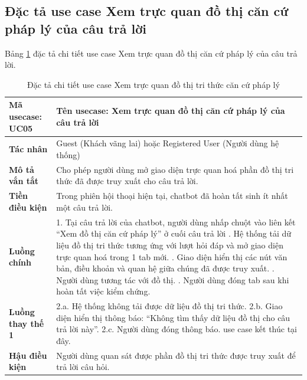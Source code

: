 \documentclass[../DoAn.tex]{subfiles}
\begin{document}
\subsection{Đặc tả use case Xem trực quan đồ thị căn cứ pháp lý của câu trả lời}
Bảng \ref{table:uc_specs_kg} đặc tả chi tiết use case Xem trực quan đồ thị căn cứ pháp lý của câu trả lời.
\begin{table}[H]
\centering
\begin{tabular}{|p{3.5cm}|p{11.5cm}|}
\hline
\textbf{Mã usecase:} UC05 & \textbf{Tên usecase:} Xem trực quan đồ thị căn cứ pháp lý của câu trả lời \\ \hline
\textbf{Tác nhân} & Guest (Khách vãng lai) hoặc Registered User (Người dùng hệ thống) \\ \hline
\textbf{Mô tả vắn tắt} & Cho phép người dùng mở giao diện trực quan hoá phần đồ thị tri thức đã được truy xuất cho câu trả lời. \\ \hline
\textbf{Tiền điều kiện} & Trong phiên hội thoại hiện tại, chatbot đã hoàn tất sinh ít nhất một câu trả lời. \\ \hline
\textbf{Luồng chính} &
1. Tại câu trả lời của chatbot, người dùng nhấp chuột vào liên kết ``Xem đồ thị căn cứ pháp lý'' ở cuối câu trả lời \newline
2. Hệ thống tải dữ liệu đồ thị tri thức tương ứng với lượt hỏi đáp và mở giao diện trực quan hoá trong 1 tab mới. \newline
3. Giao diện hiển thị các nút văn bản, điều khoản và quan hệ giữa chúng đã được truy xuất. \newline
4. Người dùng tương tác với đồ thị. \newline
5. Người dùng đóng tab sau khi hoàn tất việc kiểm chứng. \\ \hline
\textbf{Luồng thay thế 1} &
2.a. Hệ thống không tải được dữ liệu đồ thị tri thức. \newline
2.b. Giao diện hiển thị thông báo: ``Không tìm thấy dữ liệu đồ thị cho câu trả lời này''. \newline
2.c. Người dùng đóng thông báo. use case kết thúc tại đây. \\ \hline
\textbf{Hậu điều kiện} & Người dùng quan sát được phần đồ thị tri thức được truy xuất để trả lời câu hỏi. \\ \hline
\end{tabular}
\caption{Đặc tả chi tiết use case Xem trực quan đồ thị tri thức căn cứ pháp lý}
\label{table:uc_specs_kg}
\end{table}
\end{document}
